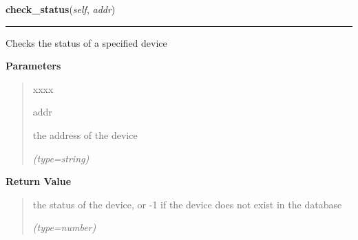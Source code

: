 \hspace{.8\funcindent}\begin{boxedminipage}{\funcwidth}

    \raggedright \textbf{check\_status}(\textit{self}, \textit{addr})

    \vspace{-1.5ex}

    \rule{\textwidth}{0.5\fboxrule}
\setlength{\parskip}{2ex}
    Checks the status of a specified device

\setlength{\parskip}{1ex}
      \textbf{Parameters}
      \vspace{-1ex}

      \begin{quote}
        \begin{Ventry}{xxxx}

          \item[addr]

          the address of the device

            {\it (type=string)}

        \end{Ventry}

      \end{quote}

      \textbf{Return Value}
    \vspace{-1ex}

      \begin{quote}
      the status of the device, or -1 if the device does not exist in the 
      database

      {\it (type=number)}

      \end{quote}

    \end{boxedminipage}

    \label{DBE:DBE:group_exists}

    \vspace{0.5ex}

